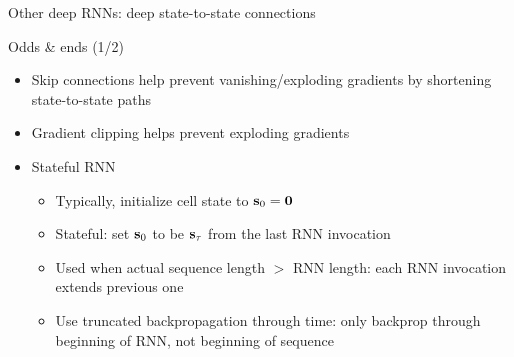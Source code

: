 \begin{frame}{Other deep RNNs: deep state-to-state connections \citep{PascanuICLR14}}
    
    
\end{frame}

\begin{frame}{Odds \& ends (1/2)}
    \begin{itemize}
        \item<+-> Skip connections help prevent vanishing/exploding gradients by shortening state-to-state paths
        \item<+-> Gradient clipping helps prevent exploding gradients \citep{MikolovPhD12,PascanuICML13}
        \item<+-> Stateful RNN
        \begin{itemize}[<.->]
            \item Typically, initialize cell state to $\mathbf{s}_0 = \mathbf{0}$
            \item<+-> Stateful: set $\mathbf{s}_0$ to be $\mathbf{s}_\tau$ from the last RNN invocation
            \item Used when actual sequence length $>$ RNN length: each RNN invocation extends previous one
            \item Use truncated backpropagation through time: only backprop through beginning of RNN, not beginning of sequence
        \end{itemize}
    \end{itemize}

    \centering
    
\end{frame}

